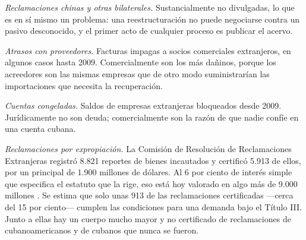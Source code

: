 \emph{Reclamaciones chinas y otras bilaterales.} Sustancialmente no divulgadas, lo que
es en sí mismo un problema: una reestructuración no puede negociarse contra un pasivo
desconocido, y el primer acto de cualquier proceso es publicar el acervo.

\emph{Atrasos con proveedores.} Facturas impagas a socios comerciales extranjeros, en
algunos casos hasta 2009. Comercialmente son los más dañinos, porque los acreedores son
las mismas empresas que de otro modo suministrarían las importaciones que necesita la
recuperación.

\emph{Cuentas congeladas.} Saldos de empresas extranjeras bloqueados desde 2009.
Jurídicamente no son deuda; comercialmente son la razón de que nadie confíe en una
cuenta cubana.

\emph{Reclamaciones por expropiación.} La Comisión de Resolución de Reclamaciones
Extranjeras registró 8.821 reportes de bienes incautados y certificó 5.913 de ellos, por
un principal de 1.900 millones de dólares. Al 6 por ciento de interés simple que
especifica el estatuto que la rige, eso está hoy valorado en algo más de 9.000 millones
\citep{fcsc}. Se estima que solo unas 913 de las reclamaciones certificadas ---cerca del
15 por ciento--- cumplen las condiciones para una demanda bajo el Título III. Junto a
ellas hay un cuerpo mucho mayor y no certificado de reclamaciones de cubanoamericanos y
de cubanos que nunca se fueron.


